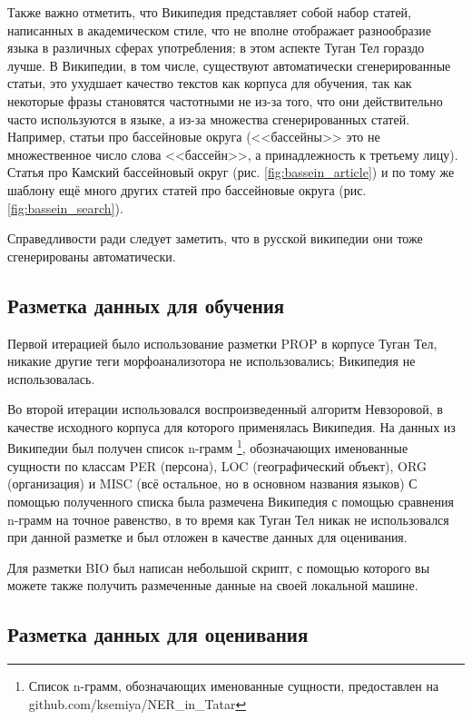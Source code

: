 Также важно отметить, что Википедия представляет собой набор статей, написанных в академическом стиле, что не вполне отображает разнообразие языка в различных сферах употребления; в этом аспекте Туган Тел гораздо лучше. В Википедии, в том числе, существуют автоматически сгенерированные статьи, это ухудшает качество текстов как корпуса для обучения, так как некоторые фразы становятся частотными не из-за того, что они действительно часто используются в языке, а из-за множества сгенерированных статей. Например, статьи про бассейновые округа (<<бассейны>> это не множественное число слова <<бассейн>>, а принадлежность к третьему лицу). Статья про Камский бассейновый округ (рис. \ref{fig:bassein_article}) и по тому же шаблону ещё много других статей про бассейновые округа (рис. \ref{fig:bassein_search}).

Справедливости ради следует заметить, что в русской википедии они тоже сгенерированы автоматически.

\subsection{Разметка данных для обучения}

Первой итерацией было использование разметки PROP в корпусе Туган Тел, никакие другие теги морфоанализотора не использовались; Википедия не использовалась. 

Во второй итерации использовался воспроизведенный алгоритм Невзоровой, в качестве исходного корпуса для которого применялась Википедия. На данных из Википедии был получен список n-грамм \footnote{Список n-грамм, обозначающих именованные сущности, предоставлен на github.com/ksemiya/NER\_in\_Tatar}, обозначающих именованные сущности по классам PER (персона), LOC (географический объект), ORG (организация) и MISC (всё остальное, но в основном названия языков) С помощью полученного списка была размечена Википедия с помощью сравнения n-грамм на точное равенство, в то время как Туган Тел никак не использовался при данной разметке и был отложен в качестве данных для оценивания.

Для разметки BIO был написан небольшой скрипт, с помощью которого вы можете также получить размеченные данные на своей локальной машине.


\subsection{Разметка данных для оценивания}

